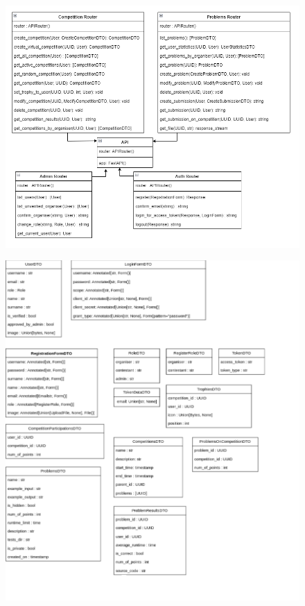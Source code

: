 			\begin{figure}[htbp]
				\centering
				\includegraphics[width=\linewidth]{slike/dijagram_razreda.png}
			\end{figure}

			\begin{figure}[htbp]
				\centering
				\includegraphics[width=\linewidth]{slike/dto.png}
			\end{figure}


